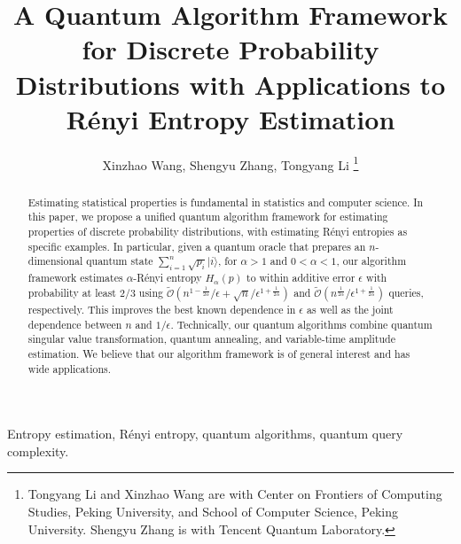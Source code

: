 \documentclass[journal]{IEEEtran}
\def\>{\rangle}
\begin{document}
\title{A Quantum Algorithm Framework for Discrete Probability Distributions with Applications to R{\'e}nyi Entropy Estimation}

\author{Xinzhao Wang, Shengyu Zhang, Tongyang Li
\thanks{Tongyang Li and Xinzhao Wang are with Center on Frontiers of Computing Studies, Peking University, and School of Computer Science, Peking University. Shengyu Zhang is with Tencent Quantum Laboratory.}
}


\maketitle


\begin{abstract}
Estimating statistical properties is fundamental in statistics and computer science. In this paper, we propose a unified quantum algorithm framework for estimating properties of discrete probability distributions, with estimating R{\'e}nyi entropies as specific examples. In particular, given a quantum oracle that prepares an $n$-dimensional quantum state $\sum_{i=1}^{n}\sqrt{p_{i}}|i\>$, for $\alpha>1$ and $0<\alpha<1$, our algorithm framework estimates $\alpha$-R{\'e}nyi entropy $H_{\alpha}(p)$ to within additive error $\epsilon$ with probability at least $2/3$ using $\widetilde{\mathcal{O}}(n^{1-\frac{1}{2\alpha}}/\epsilon + \sqrt{n}/\epsilon^{1+\frac{1}{2\alpha}})$ and $\widetilde{\mathcal{O}}(n^{\frac{1}{2\alpha}}/\epsilon^{1+\frac{1}{2\alpha}})$ queries, respectively. This improves the best known dependence in $\epsilon$ as well as the joint dependence between $n$ and $1/\epsilon$. Technically, our quantum algorithms combine quantum singular value transformation, quantum annealing, and variable-time amplitude estimation. We believe that our algorithm framework is of general interest and has wide applications.
\end{abstract}

\begin{IEEEkeywords}
Entropy estimation, R{\'e}nyi entropy, quantum algorithms, quantum query complexity.
\end{IEEEkeywords}



\end{document}
